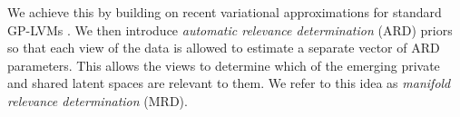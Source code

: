 We achieve this by building on recent
variational approximations for standard GP-LVMs
\cite{Titsias:bayesGPLVM10,Damianou:vgpds11}. We then introduce
\emph{automatic relevance determination} (ARD) priors
\cite{Rasmussen:book06} so that each view of the data is allowed to estimate
a separate vector of ARD parameters. This allows the views to determine
which of the emerging private and shared latent spaces are relevant to
them. We refer to this idea as \emph{manifold relevance determination}
(MRD).%

